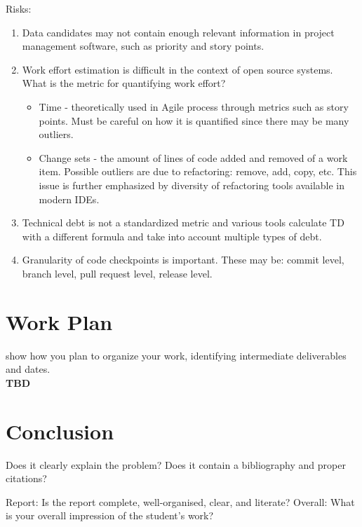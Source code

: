 \documentclass{mprop}
\begin{document}
Risks:
\begin{enumerate}
	\item Data candidates may not contain enough relevant information in
	      project management software, such as priority and story points.
	\item Work effort estimation is difficult in the context of open source
	      systems. What is the metric for quantifying work effort?
	      \begin{itemize}
		      \item Time - theoretically used in Agile process through
		            metrics such as story points. Must be careful on how it
		            is quantified since there may be many outliers.
		      \item Change sets - the amount of lines of code added and
		            removed of a work item. Possible outliers are due to
		            refactoring: remove, add, copy, etc. This issue is
		            further emphasized by diversity of refactoring tools
		            available in modern IDEs.
	      \end{itemize}
	\item Technical debt is not a standardized metric and various tools
	      calculate TD with a different formula and take into account multiple types
	      of debt.
	\item Granularity of code checkpoints is important. These may be: commit
	      level, branch level, pull request level, release level.
\end{enumerate}

\section{Work Plan}

show how you plan to organize your work, identifying intermediate deliverables
and dates.\\
\textbf{TBD}

\section{Conclusion}

Does it clearly explain the problem? Does it contain a bibliography and proper
citations?

Report: Is the report complete, well-organised, clear, and literate? Overall:
What is your overall impression of the student’s work?

\pagebreak


\end{document}
